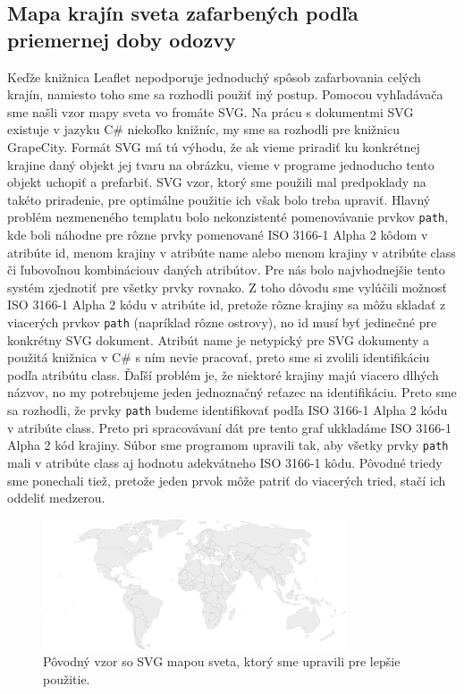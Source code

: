 \subsection{Mapa krajín sveta zafarbených podľa priemernej doby odozvy}
Keďže knižnica Leaflet nepodporuje jednoduchý spôsob zafarbovania celých krajín, namiesto toho sme sa rozhodli použiť iný postup. Pomocou vyhľadávača sme
našli vzor mapy sveta vo fromáte SVG. Na prácu s dokumentmi SVG existuje v jazyku C\# niekoľko knižníc, my sme sa rozhodli pre knižnicu GrapeCity. 
Formát SVG má tú výhodu, že ak vieme priradiť ku konkrétnej krajine daný objekt jej tvaru na obrázku, vieme v programe 
jednoducho tento objekt uchopiť a prefarbiť. SVG vzor, ktorý sme použili \cite{svg_mapa} mal predpoklady na takéto priradenie, pre optimálne použitie ich 
však bolo treba upraviť. Hlavný problém nezmeneného templatu bolo nekonzistenté pomenovávanie prvkov \lstinline{path}, kde boli náhodne pre rôzne prvky 
pomenované ISO 3166-1 Alpha 2 kôdom v atribúte id, menom krajiny v atribúte name alebo menom krajiny v atribúte class či ľubovoľnou kombináciouv daných atribútov. 
Pre nás bolo najvhodnejšie tento systém zjednotiť pre všetky prvky rovnako. Z toho dôvodu sme vylúčili možnosť ISO 3166-1 Alpha 2 kódu v atribúte id, pretože rôzne krajiny 
sa môžu skladať z viacerých prvkov \lstinline{path} (napríklad rôzne ostrovy), no id musí byť jedinečné pre konkrétny SVG dokument. Atribút name je netypický 
pre SVG dokumenty a použitá knižnica v C\# s ním nevie pracovať, preto sme si zvolili identifikáciu podľa atribútu class. Ďaľší problém je, že niektoré krajiny 
majú viacero dlhých názvov, no my potrebujeme jeden jednoznačný reťazec na identifikáciu. Preto sme sa rozhodli, že prvky \lstinline{path} budeme identifikovať 
podľa ISO 3166-1 Alpha 2 kódu v atribúte class. Preto pri spracovávaní dát pre tento graf ukkladáme ISO 3166-1 Alpha 2 kód krajiny. Súbor sme programom 
upravili tak, aby všetky prvky \lstinline{path} mali v atribúte class aj hodnotu adekvátneho ISO 3166-1 kôdu. Pôvodné triedy sme ponechali tiež, pretože jeden 
prvok môže patriť do viacerých tried, stačí ich oddeliť medzerou. 


\begin{figure}
    \centerline{\includegraphics[width=0.8\textwidth]{images/world}}
    \caption[Neupravený svg vzor]{Pôvodný vzor so SVG mapou sveta, ktorý sme upravili pre lepšie použitie. }
    \label{obr:world}
\end{figure}

